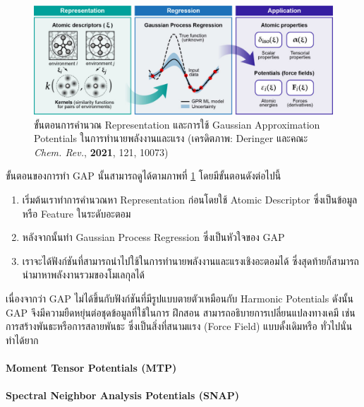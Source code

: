 \begin{figure}[htbp]
    \centering
    \includegraphics[width=\linewidth]{fig/gap_procedure.jpeg}
    \caption{ขั้นตอนการคำนวณ Representation และการใช้ Gaussian Approximation Potentials ในการทำนายพลังงานและแรง
    (เครดิตภาพ: Deringer และคณะ \textit{Chem. Rev.}, \textbf{2021}, 121, 10073\autocite{deringer2019})}
    \label{fig:gap_procedure}
\end{figure}

ขั้นตอนของการทำ GAP นั้นสามารถดูได้ตามภาพที่ \ref{fig:gap_procedure} โดยมีขั้นตอนดังต่อไปนี้
\begin{enumerate}
    \item เริ่มต้นเราทำการคำนวณหา Representation ก่อนโดยใช้ Atomic Descriptor ซึ่งเป็นข้อมูลหรือ Feature ในระดับอะตอม
    \item หลังจากนั้นทำ Gaussian Process Regression ซึ่งเป็นหัวใจของ GAP
    \item เราจะได้ฟังก์ชันที่สามารถนำไปใช้ในการทำนายพลังงานและแรงเชิงอะตอมได้ ซึ่งสุดท้ายก็สามารถนำมาหาพลังงานรวมของโมเลกุลได้
\end{enumerate}

เนื่องจากว่า GAP ไม่ได้ขึ้นกับฟังก์ชันที่มีรูปแบบตายตัวเหมือนกับ Harmonic Potentials ดังนั้น GAP จึงมีความยืดหยุ่นต่อชุดข้อมูลที่ใช้ในการ%
ฝึกสอน สามารถอธิบายการเปลี่ยนแปลงทางเคมี เช่น การสร้างพันธะหรือการสลายพันธะ ซึ่งเป็นสิ่งที่สนามแรง (Force Field) แบบดั้งเดิมหรือ%
ทั่วไปนั่นทำได้ยาก\autocite{ceriotti2018}

\paragraph{Moment Tensor Potentials (MTP)}
\autocite{shapeev2016}
    
\paragraph{Spectral Neighbor Analysis Potentials (SNAP)} 
\autocite{thompson2015,deng2019,cusentino2020,domina2022}

